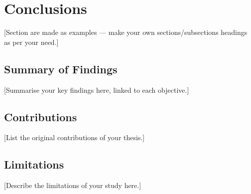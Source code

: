 


\chapter{Conclusions}
\label{chap:conclusions}

[Section are made as examples — make your own sections/subsections headings as per your need.]

\section{Summary of Findings}
\label{sec:summary}


[Summarise your key findings here, linked to each objective.]

\section{Contributions}
\label{sec:contributions}


[List the original contributions of your thesis.]

\section{Limitations}
\label{sec:limitations}


[Describe the limitations of your study here.]

